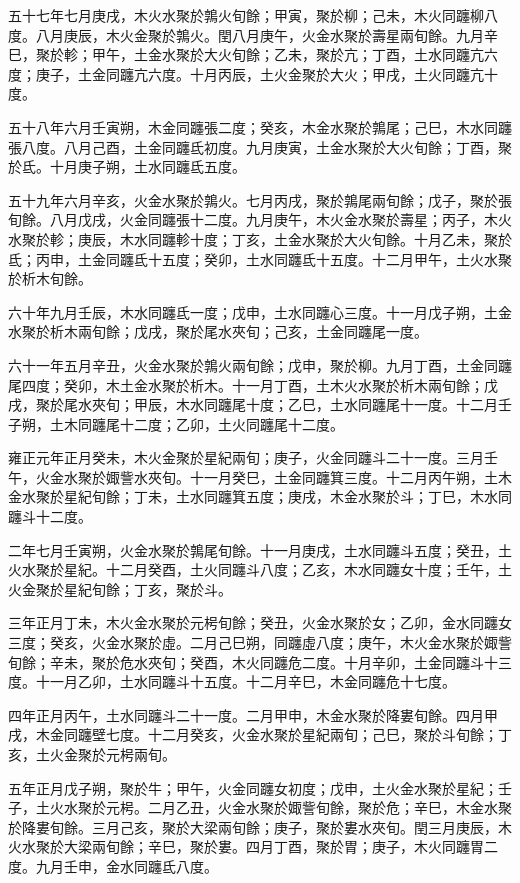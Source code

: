 \begin{pinyinscope}
五十七年七月庚戌，木火水聚於鶉火旬餘；甲寅，聚於柳；己未，木火同躔柳八度。八月庚辰，木火金聚於鶉火。閏八月庚午，火金水聚於壽星兩旬餘。九月辛巳，聚於軫；甲午，土金水聚於大火旬餘；乙未，聚於亢；丁酉，土水同躔亢六度；庚子，土金同躔亢六度。十月丙辰，土火金聚於大火；甲戌，土火同躔亢十度。

五十八年六月壬寅朔，木金同躔張二度；癸亥，木金水聚於鶉尾；己巳，木水同躔張八度。八月己酉，土金同躔氐初度。九月庚寅，土金水聚於大火旬餘；丁酉，聚於氐。十月庚子朔，土水同躔氐五度。

五十九年六月辛亥，火金水聚於鶉火。七月丙戌，聚於鶉尾兩旬餘；戊子，聚於張旬餘。八月戊戌，火金同躔張十二度。九月庚午，木火金水聚於壽星；丙子，木火水聚於軫；庚辰，木水同躔軫十度；丁亥，土金水聚於大火旬餘。十月乙未，聚於氐；丙申，土金同躔氐十五度；癸卯，土水同躔氐十五度。十二月甲午，土火水聚於析木旬餘。

六十年九月壬辰，木水同躔氐一度；戊申，土水同躔心三度。十一月戊子朔，土金水聚於析木兩旬餘；戊戌，聚於尾水夾旬；己亥，土金同躔尾一度。

六十一年五月辛丑，火金水聚於鶉火兩旬餘；戊申，聚於柳。九月丁酉，土金同躔尾四度；癸卯，木土金水聚於析木。十一月丁酉，土木火水聚於析木兩旬餘；戊戌，聚於尾水夾旬；甲辰，木水同躔尾十度；乙巳，土水同躔尾十一度。十二月壬子朔，土木同躔尾十二度；乙卯，土火同躔尾十二度。

雍正元年正月癸未，木火金聚於星紀兩旬；庚子，火金同躔斗二十一度。三月壬午，火金水聚於娵訾水夾旬。十一月癸巳，土金同躔箕三度。十二月丙午朔，土木金水聚於星紀旬餘；丁未，土水同躔箕五度；庚戌，木金水聚於斗；丁巳，木水同躔斗十二度。

二年七月壬寅朔，火金水聚於鶉尾旬餘。十一月庚戌，土水同躔斗五度；癸丑，土火水聚於星紀。十二月癸酉，土火同躔斗八度；乙亥，木水同躔女十度；壬午，土火金聚於星紀旬餘；丁亥，聚於斗。

三年正月丁未，木火金水聚於元枵旬餘；癸丑，火金水聚於女；乙卯，金水同躔女三度；癸亥，火金水聚於虛。二月己巳朔，同躔虛八度；庚午，木火金水聚於娵訾旬餘；辛未，聚於危水夾旬；癸酉，木火同躔危二度。十月辛卯，土金同躔斗十三度。十一月乙卯，土水同躔斗十五度。十二月辛巳，木金同躔危十七度。

四年正月丙午，土水同躔斗二十一度。二月甲申，木金水聚於降婁旬餘。四月甲戌，木金同躔壁七度。十二月癸亥，火金水聚於星紀兩旬；己巳，聚於斗旬餘；丁亥，土火金聚於元枵兩旬。

五年正月戊子朔，聚於牛；甲午，火金同躔女初度；戊申，土火金水聚於星紀；壬子，土火水聚於元枵。二月乙丑，火金水聚於娵訾旬餘，聚於危；辛巳，木金水聚於降婁旬餘。三月己亥，聚於大梁兩旬餘；庚子，聚於婁水夾旬。閏三月庚辰，木火水聚於大梁兩旬餘；辛巳，聚於婁。四月丁酉，聚於胃；庚子，木火同躔胃二度。九月壬申，金水同躔氐八度。


\end{pinyinscope}
